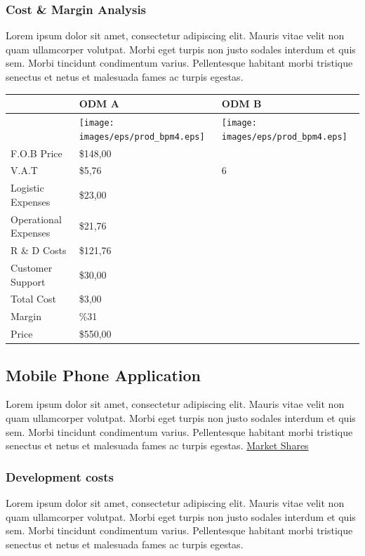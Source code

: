 \documentclass[11pt]{article}
\begin{document}
\subsubsection{Cost \& Margin Analysis}
Lorem ipsum dolor sit amet, consectetur adipiscing elit. Mauris vitae velit 
non quam ullamcorper volutpat. Morbi eget turpis non justo sodales interdum 
et quis sem. Morbi tincidunt condimentum varius. Pellentesque habitant morbi 
tristique senectus et netus et malesuada fames ac turpis egestas.\newline
\begin{tabular}{ | l | l | l | }\hline
  & ODM A & ODM B \\ \hline
  & \texttt{[image: images/eps/prod\_bpm4.eps]} & \texttt{[image: images/eps/prod\_bpm4.eps]} \\ \hline
  F.O.B Price & \$148,00 &  \\ \hline
  V.A.T & \$5,76 & 6 \\ \hline
  Logistic Expenses & \$23,00 &  \\ \hline
  Operational Expenses & \$21,76 &  \\ \hline
  R \& D Costs & \$121,76 &  \\ \hline
  Customer Support & \$30,00 &  \\ \hline
  Total Cost & \$3,00 &  \\ \hline
  Margin & \%31 &  \\ \hline
  Price & \$550,00 &  \\ \hline
\end{tabular}
\pagebreak

\subsection{Mobile Phone Application}
Lorem ipsum dolor sit amet, consectetur adipiscing elit. Mauris vitae velit 
non quam ullamcorper volutpat. Morbi eget turpis non justo sodales interdum 
et quis sem. Morbi tincidunt condimentum varius. Pellentesque habitant morbi 
tristique senectus et netus et malesuada fames ac turpis egestas.\newline
\hyperlink{market_share}{Market Shares}
 
\subsubsection{Development costs}
Lorem ipsum dolor sit amet, consectetur adipiscing elit. Mauris vitae velit 
non quam ullamcorper volutpat. Morbi eget turpis non justo sodales interdum 
et quis sem. Morbi tincidunt condimentum varius. Pellentesque habitant morbi 
tristique senectus et netus et malesuada fames ac turpis egestas.\newline
\end{document}
